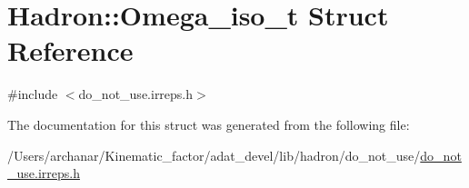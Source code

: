 \hypertarget{structHadron_1_1Omega__iso__t}{}\section{Hadron\+:\+:Omega\+\_\+iso\+\_\+t Struct Reference}
\label{structHadron_1_1Omega__iso__t}


{\ttfamily \#include $<$do\+\_\+not\+\_\+use.\+irreps.\+h$>$}



The documentation for this struct was generated from the following file\+:\begin{DoxyCompactItemize}
\item 
/\+Users/archanar/\+Kinematic\+\_\+factor/adat\+\_\+devel/lib/hadron/do\+\_\+not\+\_\+use/\mbox{\hyperlink{do__not__use_8irreps_8h}{do\+\_\+not\+\_\+use.\+irreps.\+h}}\end{DoxyCompactItemize}
